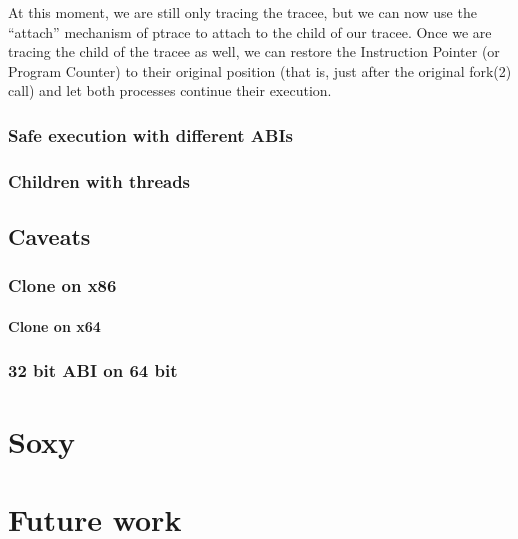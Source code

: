 \documentclass[a4paper, twoside, 10pt, twocolumn]{report}
\begin{document}
At this moment, we are still only tracing the tracee, but we can now use the
``attach'' mechanism of ptrace to attach to the child of our tracee. Once we are
tracing the child of the tracee as well, we can restore the Instruction Pointer
(or Program Counter) to their original position (that is, just after the
original fork(2) call) and let both processes continue their execution.


\subsection{Safe execution with different ABIs}

%

\subsection{Children with threads}

\section{Caveats}
%

\subsection{Clone on x86}


\subsubsection{Clone on x64}



\subsection{32 bit ABI on 64 bit}



\chapter{Soxy}


\chapter{Future work}
\end{document}
